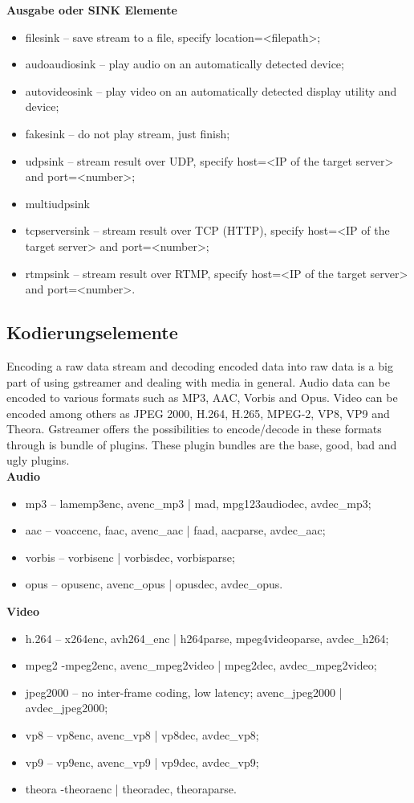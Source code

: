 \textbf{Ausgabe oder SINK Elemente}
\begin{itemize}
\item filesink – save stream to a file, specify location=<filepath>;
\item  audoaudiosink – play audio on an automatically detected device;
\item   autovideosink – play video on an automatically detected display utility and device;
\item   fakesink – do not play stream, just finish;
\item  udpsink – stream result over UDP, specify host=<IP of the target server> and port=<number>;
\item   multiudpsink
\item  tcpserversink – stream result over TCP (HTTP), specify host=<IP of the target server> and port=<number>;
\item rtmpsink – stream result over RTMP, specify host=<IP of the target server> and port=<number>.
\end{itemize}

\subsection{Kodierungselemente}
Encoding a raw data stream and decoding encoded data into raw data is a big part of using gstreamer and dealing with media in general. Audio data can be encoded to various formats such as MP3, AAC, Vorbis and Opus. Video can be encoded among others as JPEG 2000, H.264, H.265, MPEG-2, VP8, VP9 and Theora. Gstreamer offers the possibilities to encode/decode in these formats through is bundle of plugins. These plugin bundles are the base, good, bad and ugly plugins.
\\

\textbf{Audio}
\begin{itemize}
\item mp3 – lamemp3enc, avenc\_mp3 | mad, mpg123audiodec, avdec\_mp3; 
\item  aac – voaccenc, faac, avenc\_aac | faad, aacparse, avdec\_aac;
\item  vorbis – vorbisenc | vorbisdec, vorbisparse;
\item  opus – opusenc, avenc\_opus | opusdec, avdec\_opus.
\end{itemize}

\textbf{Video}
\begin{itemize}
\item h.264 – x264enc, avh264\_enc |  h264parse, mpeg4videoparse, avdec\_h264;
\item mpeg2 -mpeg2enc, avenc\_mpeg2video | mpeg2dec, avdec\_mpeg2video;
\item jpeg2000 – no inter-frame coding, low latency; avenc\_jpeg2000 | avdec\_jpeg2000;
\item vp8 – vp8enc, avenc\_vp8 | vp8dec, avdec\_vp8;
\item vp9 – vp9enc, avenc\_vp9 | vp9dec, avdec\_vp9;
\item theora -theoraenc | theoradec, theoraparse.
\end{itemize}

